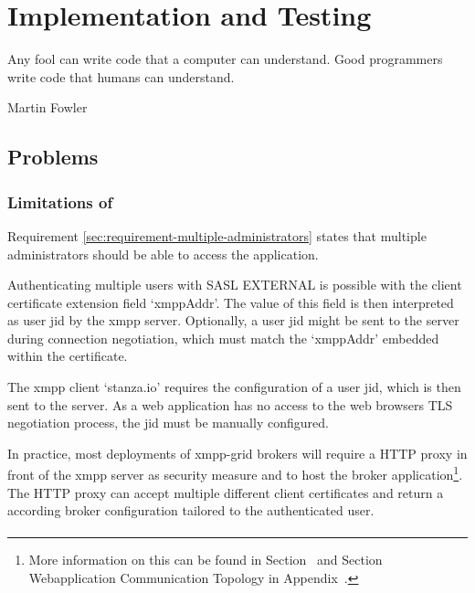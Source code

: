 \chapter{Implementation and Testing} %
\epigraph{Any fool can write code that a computer can understand. Good programmers write code that humans can understand.}{Martin Fowler}

\section{Problems}

\subsection{Limitations of \emph{}}\label{sec:limitations-of-requirement-multiple-administrators}

Requirement \ref{sec:requirement-multiple-administrators} states that multiple administrators should be able to access the application.

Authenticating multiple users with SASL EXTERNAL is possible with the client certificate extension field `xmppAddr'.
The value of this field is then interpreted as user \gls{jid} by the \gls{xmpp} server.
Optionally, a user \gls{jid} might be sent to the server during connection negotiation, which must match the `xmppAddr' embedded within the certificate. \cite{xep-0178}

The \gls{xmpp} client `stanza.io' requires the configuration of a user \gls{jid}, which is then sent to the server. As a web application has no access to the web browsers TLS negotiation process, the \gls{jid} must be manually configured.

In practice, most deployments of \gls{xmpp-grid} \glspl{broker} will require a HTTP proxy in front of the \gls{xmpp} server as security measure and to host the \gls{broker} application\footnote{
More information on this can be found in Section~ and Section Webapplication Communication Topology in Appendix~.}.
The HTTP proxy can accept multiple different client certificates and return a according \gls{broker} configuration tailored to the authenticated user.


\subsubsection{\emph{}}

